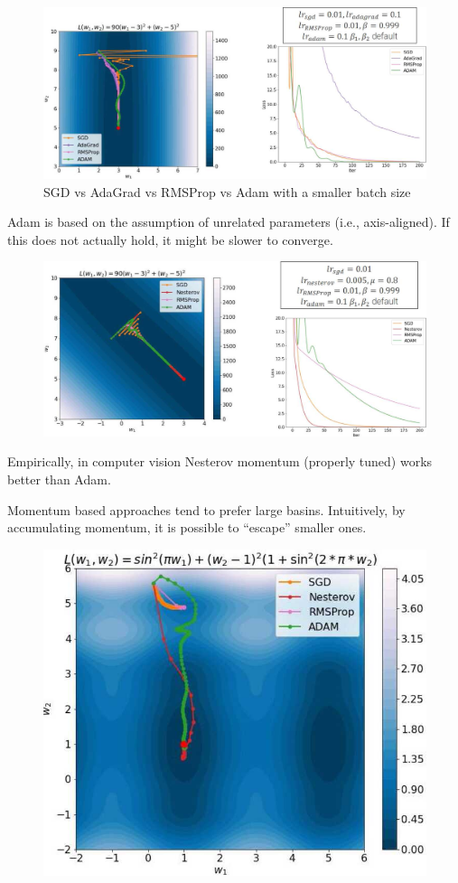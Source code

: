\begin{description}
        \begin{figure}[H]
            \centering
            \includegraphics[width=0.75\linewidth]{./img/adam_noisy.jpg}
            \caption{SGD vs AdaGrad vs RMSProp vs Adam with a smaller batch size}
        \end{figure}

        \begin{remark}
            Adam is based on the assumption of unrelated parameters (i.e., axis-aligned). If this does not actually hold, it might be slower to converge.

            \begin{figure}[H]
                \centering
                \includegraphics[width=0.8\linewidth]{./img/optimizers_no_align.jpg}
            \end{figure}
        \end{remark}
\end{description}

\begin{remark}
    Empirically, in computer vision Nesterov momentum (properly tuned) works better than Adam.
\end{remark}

\begin{remark}
    Momentum based approaches tend to prefer large basins. Intuitively, by accumulating momentum, it is possible to ``escape'' smaller ones.

    \begin{figure}[H]
        \centering
        \includegraphics[width=0.35\linewidth]{./img/momentum_local_global.jpg}
    \end{figure}
\end{remark}


